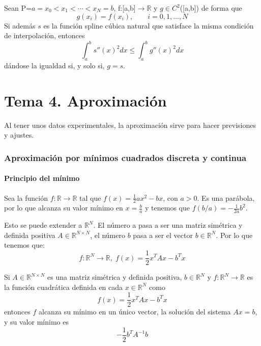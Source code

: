 \begin{nprop}
Sean P={$a=x_0 < x_1 < \cdots < x_N = b$}, f:[a,b]$\longrightarrow \mathbb{R}$ y $g \in C^2$([a,b]) de forma que
\[ g(x_i) = f(x_i), \qquad i =0,1,...,N \]
Si además $s$ es la función spline cúbica natural que satisface la misma condición de interpolación, entonces
\[ \int_a^b s''(x)^2dx \leq \int_a^b g''(x)^2 dx \]
dándose la igualdad si, y solo si, $g = s$.
\end{nprop}

\pagebreak

\part{Tema 4. Aproximación}
Al tener unos datos experimentales, la aproximación sirve para hacer previsiones y ajustes.

\section{Aproximación por mínimos cuadrados discreta y continua}

\subsection{Principio del mínimo}
Sea la función $f: \mathbb{R} \longrightarrow \mathbb{R}$ tal que $f(x)=\frac{1}{2}ax^2-bx$, con $a > 0$. Es una parábola, por lo que alcanza su valor mínimo en $x = \frac{b}{a}$ y tenemos que $f(b/a) = - \frac{1}{2a}b^2$.

Esto se puede extender a $\mathbb{R}^N$. El número a pasa a ser una matriz simétrica y definida positiva $A \in \mathbb{R}^{N \times N}$, el número $b$ pasa a ser el vector $b \in \mathbb{R}^N$. Por lo que tenemos que:
\[ f: \mathbb{R}^N \longrightarrow \mathbb{R}, \; f(x) = \frac{1}{2}x^TAx-b^Tx \]

\begin{nth}
Si $A \in \mathbb{R}^{N \times N}$ es una matriz simétrica y definida positiva, $b \in \mathbb{R}^N$ y $f: \mathbb{R}^N \longrightarrow \mathbb{R}$ es la función cuadrática definida en cada $x \in \mathbb{R}^N$ como
\[ f(x) = \frac{1}{2}x^TAx-b^Tx \]
entonces $f$ alcanza su mínimo en un único vector, la solución del sistema $Ax=b$, y su valor mínimo es
\[ - \frac{1}{2}b^TA^{-1}b \]
\end{nth}

